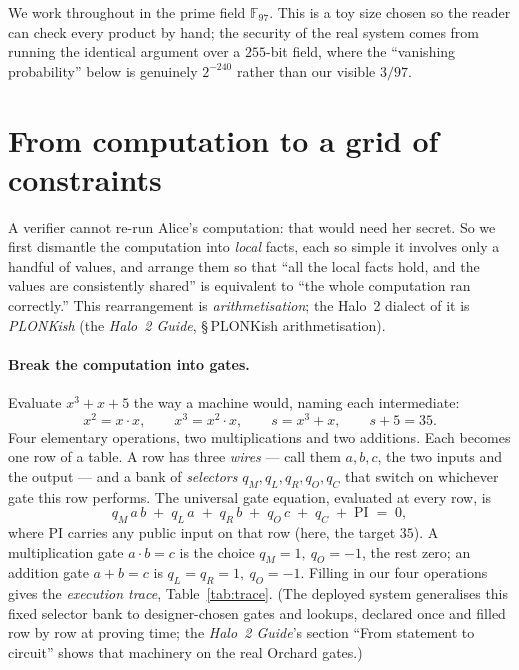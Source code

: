 \documentclass[11pt,a4paper]{article}
\theoremstyle{definition}
\newcommand{\F}{\mathbb{F}}
\begin{document}
We work throughout in the prime field $\F_{97}$. This is a toy size chosen so
the reader can check every product by hand; the security of the real system
comes from running the identical argument over a $255$-bit field, where the
``vanishing probability'' below is genuinely $2^{-240}$ rather than our
visible $3/97$.

\section{From computation to a grid of constraints}\label{sec:arith}

A verifier cannot re-run Alice's computation: that would need her secret. So we
first dismantle the computation into \emph{local} facts, each so simple it
involves only a handful of values, and arrange them so that ``all the local
facts hold, and the values are consistently shared'' is equivalent to ``the
whole computation ran correctly.'' This rearrangement is \emph{arithmetisation};
the Halo~2 dialect of it is \emph{PLONKish} (the \emph{Halo~2 Guide},
\S\,PLONKish arithmetisation).

\paragraph{Break the computation into gates.} Evaluate $x^3 + x + 5$ the way a
machine would, naming each intermediate:
\[
x^2 = x \cdot x, \qquad x^3 = x^2 \cdot x, \qquad s = x^3 + x, \qquad s + 5 = 35.
\]
Four elementary operations, two multiplications and two additions. Each becomes
one row of a table. A row has three \emph{wires} --- call them $a, b, c$, the
two inputs and the output --- and a bank of \emph{selectors}
$q_M, q_L, q_R, q_O, q_C$ that switch on whichever gate this row performs. The
universal gate equation, evaluated at every row, is
\begin{equation}\label{eq:gate}
q_M\,a\,b \;+\; q_L\,a \;+\; q_R\,b \;+\; q_O\,c \;+\; q_C \;+\; \mathrm{PI} \;=\; 0,
\end{equation}
where $\mathrm{PI}$ carries any public input on that row (here, the target
$35$). A multiplication gate $a\cdot b = c$ is the choice
$q_M = 1,\ q_O = -1$, the rest zero; an addition gate $a + b = c$ is
$q_L = q_R = 1,\ q_O = -1$. Filling in our four operations gives the
\emph{execution trace}, Table~\ref{tab:trace}. (The deployed system
generalises this fixed selector bank to designer-chosen gates and lookups,
declared once and filled row by row at proving time; the \emph{Halo~2
Guide}'s section ``From statement to circuit'' shows that machinery on the
real Orchard gates.)
\end{document}
